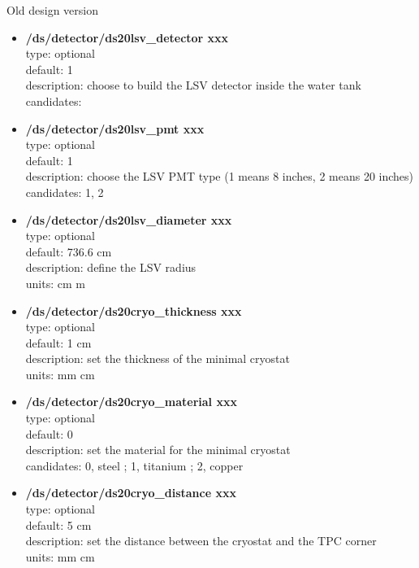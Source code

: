 \documentclass[twocolumn, 10pt]{article}
\begin{document}
Old design version 

\begin{itemize}

\item \textbf{/ds/detector/ds20lsv\_detector xxx}\\
type: optional \\
default: 1 \\
description: choose to build the LSV detector inside the water tank \\
candidates: \\

\item \textbf{/ds/detector/ds20lsv\_pmt xxx}\\
type: optional \\
default: 1 \\
description: choose the LSV PMT type (1 means 8 inches, 2 means 20 inches)  \\
candidates: 1, 2\\

\item \textbf{/ds/detector/ds20lsv\_diameter xxx}\\
type: optional \\
default: 736.6 cm \\
description: define the LSV radius\\
units: cm m \\

\item \textbf{/ds/detector/ds20cryo\_thickness xxx}\\
type: optional \\
default:  1 cm\\
description: set the thickness of the minimal cryostat \\
units: mm cm \\

\item \textbf{/ds/detector/ds20cryo\_material xxx}\\
type: optional \\
default: 0 \\
description: set the material for the minimal cryostat \\
candidates: 0, steel ; 1, titanium ; 2, copper \\

\item \textbf{/ds/detector/ds20cryo\_distance xxx}\\
type: optional \\
default: 5 cm  \\
description: set the distance between the cryostat and the TPC corner \\
units: mm cm \\

\end{itemize}
\end{document}
